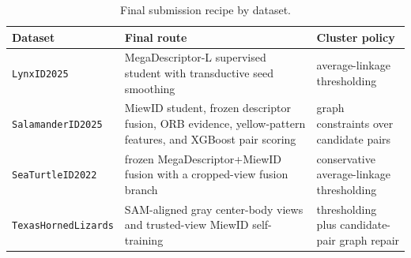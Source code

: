 \documentclass{ceurart}
\newcommand{\dataset}[1]{\texttt{#1}}
\begin{document}
\begin{table}[t]
  \centering
  \caption{Final submission recipe by dataset.}
  \label{tab:final-recipe}
  \small
  \begin{tabularx}{\linewidth}{lYl}
    \toprule
    Dataset & Final route & Cluster policy \\
    \midrule
    \dataset{LynxID2025} & MegaDescriptor-L supervised student with transductive seed smoothing & average-linkage thresholding \\
    \dataset{SalamanderID2025} & MiewID student, frozen descriptor fusion, ORB evidence, yellow-pattern features, and XGBoost pair scoring & graph constraints over candidate pairs \\
    \dataset{SeaTurtleID2022} & frozen MegaDescriptor+MiewID fusion with a cropped-view fusion branch & conservative average-linkage thresholding \\
    \dataset{TexasHornedLizards} & SAM-aligned gray center-body views and trusted-view MiewID self-training & thresholding plus candidate-pair graph repair \\
    \bottomrule
  \end{tabularx}
\end{table}
\end{document}
